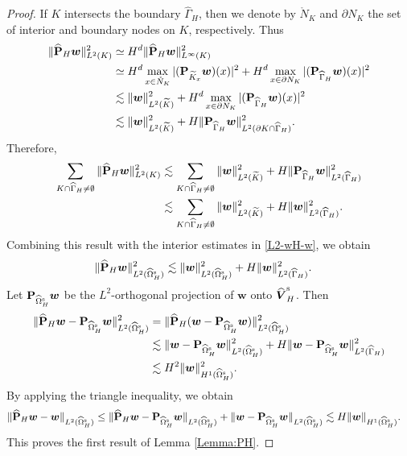 \documentclass[11pt,reqno]{amsart}
\theoremstyle{definition}
\theoremstyle{plain}
\numberwithin{theorem}{section}
\numberwithin{proposition}{section}
\numberwithin{lemma}{section}
\numberwithin{equation}{section}
\newcommand{\bs}[1]{\boldsymbol{#1}}
\renewcommand{\(}{\bigl(}
\renewcommand{\)}{\bigr)}
\begin{document}
\begin{proof}
If $K$ intersects the boundary $\widehat\Gamma_H$, then we denote by $\mathring N_K$ and $\partial N_K$ the set of interior and boundary nodes on $K$, respectively. Thus 
\begin{align*}
\|\widehat{\bf P}_H{\bs w}\|_{L^2(K)}^2
&\simeq H^d\|\widehat{\bf P}_H{\bs w}\|_{L^\infty(K)}^2 \\
&\simeq H^d\max_{x\in \mathring N_K}|({\bf P}_{\widetilde K_x}{\bs w})(x)|^2 + H^d\max_{x\in \partial N_K}|({\bf P}_{\widehat\Gamma_H}{\bs w})(x)|^2 \\
&\lesssim \|{\bs w}\|_{L^2(\widetilde K)}^2 + H^d\max_{x\in \partial N_K}|({\bf P}_{\widehat\Gamma_H}{\bs w})(x)|^2 \\
&\lesssim \|{\bs w}\|_{L^2(\widetilde K)}^2 + H \|{\bf P}_{\widehat\Gamma_H}{\bs w}\|_{L^2(\partial K \cap \widehat\Gamma_H)}^2 .
\end{align*}
Therefore, 
\begin{align*}
\sum_{K\cap\widehat\Gamma_H\neq\emptyset} \|\widehat{\bf P}_H{\bs w}\|_{L^2(K)}^2
&\lesssim \sum_{K\cap\widehat\Gamma_H\neq\emptyset}\|{\bs w}\|_{L^2(\widetilde K)}^2 + 
H \|{\bf P}_{\widehat\Gamma_H}{\bs w}\|_{L^2(\widehat\Gamma_H)}^2 \\
&\lesssim \sum_{K\cap\widehat\Gamma_H\neq\emptyset}\|{\bs w}\|_{L^2(\widetilde K)}^2 + 
H \|{\bs w}\|_{L^2(\widehat\Gamma_H)}^2 .
\end{align*}
Combining this result with the interior estimates in \eqref{L2-wH-w}, we obtain  
\begin{align*}
\|\widehat{\bf P}_H{\bs w}\|_{L^2(\widehat\Omega^{\rm s}_H)}^2
&\lesssim \|{\bs w}\|_{L^2(\widehat\Omega^{\rm s}_H)}^2  + 
H \|{\bs w}\|_{L^2(\widehat\Gamma_H)}^2 .
\end{align*}
Let ${\bf P}_{\widehat\Omega^{\rm s}_H}{\bs w}$ be the $L^2$-orthogonal projection of ${\bs w}$ onto $\widehat{\bs V}^{\rm s}_H$. Then 
\begin{align}\label{PHw-POmegaw}
\|\widehat{\bf P}_H{\bs w}-{\bf P}_{\widehat\Omega^{\rm s}_H}{\bs w}\|_{L^2(\widehat\Omega^{\rm s}_H)}^2
&= 
\|\widehat{\bf P}_H({\bs w}-{\bf P}_{\widehat\Omega^{\rm s}_H}{\bs w})\|_{L^2(\widehat\Omega^{\rm s}_H)}^2 \notag\\
&\lesssim \|{\bs w}-{\bf P}_{\widehat\Omega^{\rm s}_H}{\bs w}\|_{L^2(\widehat\Omega^{\rm s}_H)}^2  + 
H \|{\bs w}-{\bf P}_{\widehat\Omega^{\rm s}_H}{\bs w}\|_{L^2(\widehat\Gamma_H)}^2 \notag\\
&\lesssim H^2\|{\bs w}\|_{H^1(\widehat\Omega^{\rm s}_H)}^2  .
\end{align}
By applying the triangle inequality, we obtain 
\begin{align*}
\|\widehat{\bf P}_H{\bs w}-{\bs w}\|_{L^2(\widehat\Omega^{\rm s}_H)}
\le 
\|\widehat{\bf P}_H{\bs w}-{\bf P}_{\widehat\Omega^{\rm s}_H}{\bs w}\|_{L^2(\widehat\Omega^{\rm s}_H)}
+ \|{\bs w}-{\bf P}_{\widehat\Omega^{\rm s}_H}{\bs w}\|_{L^2(\widehat\Omega^{\rm s}_H)} 
&\lesssim H\|{\bs w}\|_{H^1(\widehat\Omega^{\rm s}_H)}.
\end{align*}
This proves the first result of Lemma \ref{Lemma:PH}. 


\end{proof}
\end{document}
